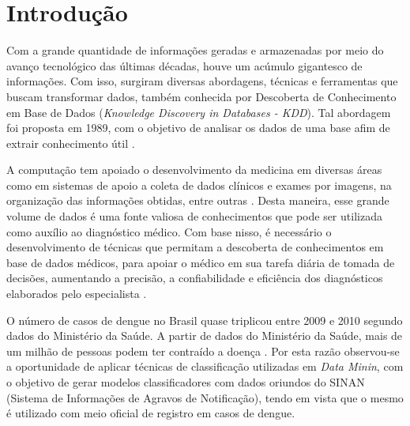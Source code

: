 \documentclass[
	12pt,				%
	openright,			%
	oneside,	
	a4paper,				%
	english,				%
	brazil				%
]{abntex2/abntex2} %
\begin{document}



\tableofcontents*
\cleardoublepage

\textual

\chapter{Introdução}

	Com a grande quantidade de informações geradas e armazenadas por meio do avanço tecnológico das últimas décadas, houve um acúmulo gigantesco de informações. Com isso, surgiram diversas abordagens, técnicas e ferramentas que buscam transformar dados, também conhecida por Descoberta de Conhecimento em Base de Dados (\textit{Knowledge Discovery in Databases - KDD}). Tal abordagem foi proposta em 1989, com o objetivo de analisar os dados de uma base afim de extrair conhecimento útil \cite{fayyad:1996}.	
	
	A computação tem apoiado o desenvolvimento da medicina em diversas áreas como em sistemas de apoio a coleta de dados clínicos e exames por imagens, na organização das informações obtidas, entre outras \cite{costa:2012}. Desta maneira, esse grande volume de dados é uma fonte valiosa de conhecimentos que pode ser utilizada como auxílio ao diagnóstico médico. Com base nisso, é necessário o desenvolvimento de técnicas que permitam a descoberta de conhecimentos em base de dados médicos, para apoiar o médico em sua tarefa diária de tomada de decisões, aumentando a precisão, a confiabilidade e eficiência dos diagnósticos elaborados pelo especialista \cite{costa:2012}.
	
	O número de casos de dengue no Brasil quase triplicou entre 2009 e 2010 segundo dados do Ministério da Saúde. A partir de dados do Ministério da Saúde, mais de um milhão de pessoas podem ter contraído a doença \cite{santos:2011}. Por esta razão observou-se a oportunidade de aplicar técnicas de classificação utilizadas em \textit{Data Minin}, com o objetivo de gerar modelos classificadores com dados oriundos do SINAN (Sistema de Informações de Agravos de Notificação), tendo em vista que o mesmo é utilizado com meio oficial de registro em casos de dengue.
    
\end{document}
